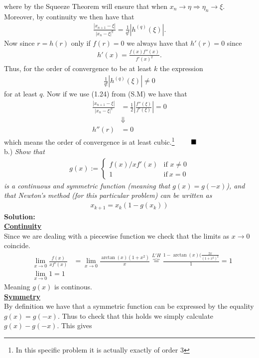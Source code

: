 \documentclass[12pt,
               a4paper,
               article,
               oneside,
               norsk,oldfontcommands]{memoir}
\newcommand{\Q}{ \qquad \hfill \blacksquare}
\newcommand{\spaze}{\vspace{4mm}\\}
\begin{document}
where by the Squeeze Theorem will ensure that when $x_n \rightarrow \eta \Rightarrow \eta_{n} \rightarrow \xi$. Moreover, by continuity we then have that 
\begin{align*}
\frac{|x_{n+1} - \xi|}{|x_n - \xi|^q} = \frac{1}{q!} |h^{(q)}(\xi)|.
\end{align*}
Now since $r = h(r)$ only if $f(r) = 0$ we always have that $h'(r) = 0$ since 
\begin{align*}
h'(x) = \frac{f(x) f''(x)}{f'(x)^2}.
\end{align*}
Thus, for the order of convergence to be at least $k$ the expression 
\begin{align*}
\frac{1}{q!} |h^{(q)} (\xi)| \neq 0
\end{align*}
for at least $q$. Now if we use (1.24) from (S.M) we have that 
\begin{align*}
\frac{|x_{n+1} - \xi|}{|x_n - \xi|^q} &= \frac{1}{2} \left| \frac{f''(\xi)}{f'(\xi)} \right| = 0 \\[5pt]
&\Downarrow \\[5pt]
h''(r) &= 0
\end{align*}
which means the order of convergence is at least cubic.\footnote{In this specific problem it is actually exactly of order 3} $\Q$ \spaze 
b.) \emph{Show that}
\begin{align*}
g(x) :=
    \begin{cases}
        f(x) / x f'(x) & \text{if } x \neq 0 \\
        1 & \text{if} \ x = 0
    \end{cases}
\end{align*}
\emph{is a continuous and symmetric function (meaning that $g(x) = g(-x)$), and that Newton's method (for this particular problem) can be written as} 
\begin{align*}
x_{k+1} = x_k(1 - g(x_k))
\end{align*}
\textbf{Solution:} \spaze 
\underline{\textbf{Continuity}}\spaze 
Since we are dealing with a piecewise function we check that the limits as $x \rightarrow 0$ coincide. 
\begin{align}
&\lim_{x \to 0} \frac{f(x)}{x f'(x)} &= \lim_{x \to 0} \frac{\arctan(x)(1 + x^2)}{x} \overbrace{=}^{L'H} \frac{1 - \arctan(x)(\frac{2x}{(1+x^2)^2}}{1} = 1 \\[5pt]
&\lim_{x \to 0} 1 = 1
\end{align}
Meaning $g(x)$ is continous. \spaze 
\underline{\textbf{Symmetry}}\spaze 
By definition we have that a symmetric function can be expressed by the equality $g(x) = g(-x)$. Thus to check that this holds we simply calculate $g(x) - g(-x)$. This gives 
\end{document}
